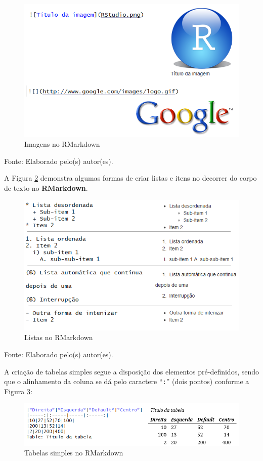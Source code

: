 \documentclass[12pt,brazil,]{book}
\begin{document}
\begin{figure}

{\centering \includegraphics[width=0.6\linewidth]{rmarkimg} 

}

\caption{Imagens no RMarkdown}\label{fig:rmarkimg}
\end{figure}

Fonte: Elaborado pelo(s) autor(es).

A Figura \ref{fig:rmarklist} demonstra algumas formas de criar listas e
itens no decorrer do corpo de texto no \textbf{RMarkdown}.

\begin{figure}

{\centering \includegraphics[width=0.6\linewidth]{rmarklist} 

}

\caption{Listas no RMarkdown}\label{fig:rmarklist}
\end{figure}

Fonte: Elaborado pelo(s) autor(es).

A criação de tabelas simples segue a disposição dos elementos
pré-definidos, sendo que o alinhamento da coluna se dá pelo caractere
``\texttt{:}'' (dois pontos) conforme a Figura \ref{fig:rmarktab}:

\begin{figure}

{\centering \includegraphics[width=0.6\linewidth]{rmarktab} 

}

\caption{Tabelas simples no RMarkdown}\label{fig:rmarktab}
\end{figure}
\end{document}
